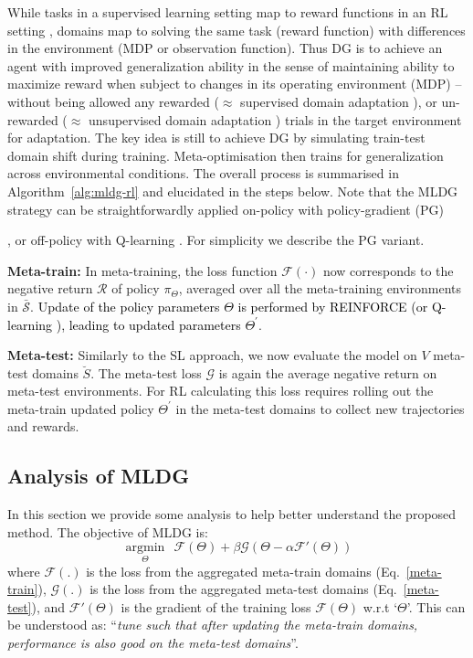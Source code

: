 \documentclass[letterpaper]{article} \usepackage{aaai18}  \usepackage{times}  \usepackage{helvet}  \usepackage{courier}  \usepackage{url}  \usepackage{graphicx}  \usepackage{amsmath}
\newcommand{\keypoint}[1]{\vspace{0.1cm}\noindent\textbf{#1}\quad}
\begin{document}
While tasks in a supervised learning setting map to reward functions in an RL setting \cite{finn2017model}, domains map to solving the same task (reward function) with differences in the environment (MDP or observation function). Thus DG is to achieve an agent with improved generalization ability in the sense of maintaining ability to maximize reward when subject to changes in its operating environment (MDP) --  without being allowed any rewarded ($\approx$ supervised domain adaptation \cite{finn2017model,ammar2014pgella}), or un-rewarded ($\approx$ unsupervised domain adaptation \cite{finn2017sslRL,ammar2015unsupTransferPGRL}) trials in the target environment for adaptation. 
The key idea is still to achieve DG by simulating train-test domain shift during training. Meta-optimisation then trains for generalization across environmental conditions. The overall process is summarised in Algorithm~\ref{alg:mldg-rl} and elucidated in the steps below. Note that the MLDG strategy can be straightforwardly applied on-policy with policy-gradient (PG) {\cite{williams1992reinforce}, or off-policy with Q-learning \cite{mnih2015dqn}. For simplicity we describe the PG variant.



\keypoint{Meta-train:} In meta-training, the loss function $\mathcal{F}(\cdot)$ now corresponds to the negative return $\mathcal{R}$ of policy $\pi_\Theta$, averaged over all the meta-training environments in $\bar{\mathcal{S}}$. \textcolor{black}{Update of the policy parameters  $\Theta$ is performed by REINFORCE \cite{williams1992reinforce} (or Q-learning \cite{mnih2015dqn}), leading to updated parameters $\Theta^{'}$}.

\keypoint{Meta-test:} Similarly to the SL approach, we now evaluate the model on $V$ meta-test domains $\breve{S}$. The meta-test loss $\mathcal{G}$ is again the average negative return on meta-test environments. For RL calculating this loss requires rolling out the meta-train updated policy $\Theta^{'}$ in the meta-test domains to collect new trajectories and rewards. 









\subsection{Analysis of MLDG}
In this section we provide some analysis to help better understand the proposed  method. The objective of MLDG is:
\begin{equation}
\underset{\Theta}{\operatorname{argmin}}~~ \mathcal{F}(\Theta) + \beta \mathcal{G}(\Theta - \alpha \mathcal{F}'(\Theta))
\label{vanilla-mldg}
\end{equation}
where $\mathcal{F}(.)$ is the loss from the aggregated meta-train domains (Eq.~\ref{meta-train}),  $\mathcal{G}(.)$ is the loss from the aggregated meta-test domains (Eq.~\ref{meta-test}), and $\mathcal{F}'(\Theta)$ is the gradient of the training loss $\mathcal{F}(\Theta)$ w.r.t `$\Theta$'.
This can be understood as: ``\emph{tune such that after updating the meta-train domains, performance is also good on the meta-test domains}''. 

}
\end{document}
